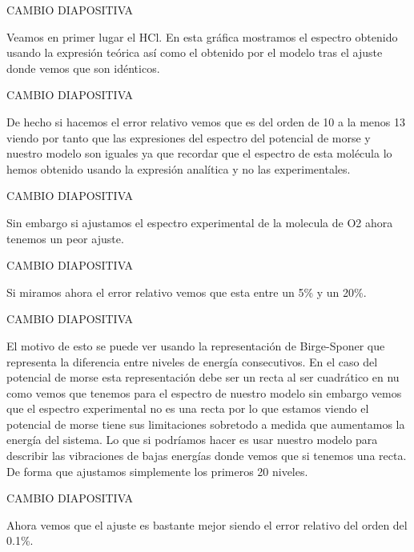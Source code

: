 \documentclass[a4paper,12pt,twoside]{article}
\begin{document}
CAMBIO DIAPOSITIVA

Veamos en primer lugar el HCl. En esta gráfica mostramos el espectro obtenido usando la expresión teórica así como el obtenido por el modelo tras el ajuste donde vemos que son idénticos.

CAMBIO DIAPOSITIVA

De hecho si hacemos el error relativo vemos que es del orden de 10 a la menos 13 viendo por tanto que las expresiones del espectro del potencial de morse y nuestro modelo son iguales ya que recordar que el espectro de esta molécula lo hemos obtenido usando la expresión analítica y no las experimentales.

CAMBIO DIAPOSITIVA

Sin embargo si ajustamos el espectro experimental de la molecula de O2 ahora tenemos un peor ajuste.

CAMBIO DIAPOSITIVA

Si miramos ahora el error relativo vemos que esta entre un 5\% y un 20\%.

CAMBIO DIAPOSITIVA

El motivo de esto se puede ver usando la representación de Birge-Sponer que representa la diferencia entre niveles de energía consecutivos. En el caso del potencial de morse esta representación debe ser un recta al ser cuadrático en nu como vemos que tenemos para el espectro de nuestro modelo sin embargo vemos que el espectro experimental no es una recta por lo que estamos viendo el potencial de morse tiene sus limitaciones sobretodo a medida que aumentamos la energía del sistema. Lo que si podríamos hacer es usar nuestro modelo para describir las vibraciones de bajas energías donde vemos que si tenemos una recta. De forma que ajustamos simplemente los primeros 20 niveles.

CAMBIO DIAPOSITIVA

Ahora vemos que el ajuste es bastante mejor siendo el error relativo del orden del 0.1\%. 
\end{document}
